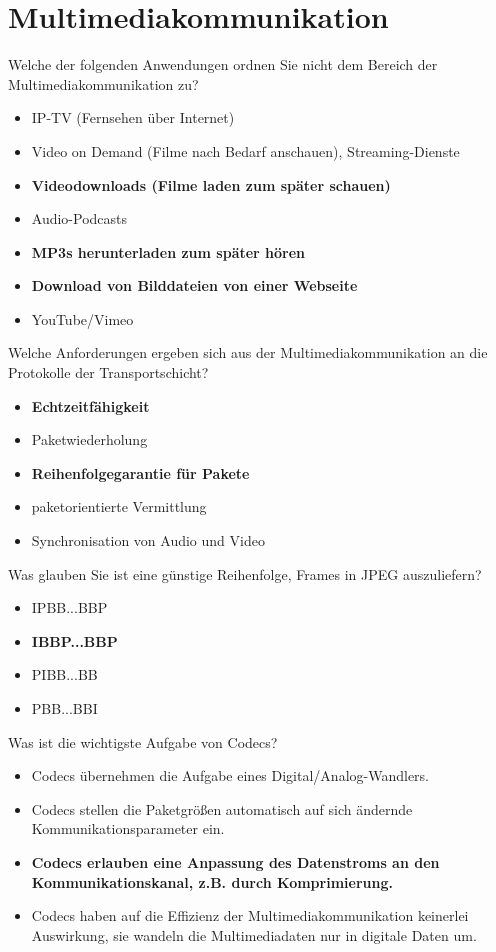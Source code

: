 \documentclass{article}
\begin{document}
	\section{Multimediakommunikation}
	
	Welche der folgenden Anwendungen ordnen Sie nicht dem Bereich der Multimediakommunikation zu? 
	\begin{itemize}
		\item IP-TV (Fernsehen über Internet)
		\item Video on Demand (Filme nach Bedarf anschauen), Streaming-Dienste
		\item \textbf{Videodownloads (Filme laden zum später schauen)}
		\item Audio-Podcasts
		\item \textbf{MP3s herunterladen zum später hören}
		\item \textbf{Download von Bilddateien von einer Webseite}
		\item YouTube/Vimeo
	\end{itemize}

	Welche Anforderungen ergeben sich aus der Multimediakommunikation an die Protokolle der Transportschicht? 
	\begin{itemize}
		\item \textbf{Echtzeitfähigkeit}
		\item Paketwiederholung
		\item \textbf{Reihenfolgegarantie für Pakete}
		\item paketorientierte Vermittlung
		\item Synchronisation von Audio und Video
	\end{itemize}

	Was glauben Sie ist eine günstige Reihenfolge, Frames in JPEG auszuliefern? 
	\begin{itemize}
		\item IPBB...BBP 
		\item \textbf{IBBP...BBP}
		\item PIBB...BB
		\item PBB...BBI
	\end{itemize}

	Was ist die wichtigste Aufgabe von Codecs?
	\begin{itemize}
		\item Codecs übernehmen die Aufgabe eines Digital/Analog-Wandlers.
		\item Codecs stellen die Paketgrößen automatisch auf sich ändernde Kommunikationsparameter ein.
		\item \textbf{Codecs erlauben eine Anpassung des Datenstroms an den Kommunikationskanal, z.B. durch Komprimierung.}
		\item Codecs haben auf die Effizienz der Multimediakommunikation keinerlei Auswirkung, sie wandeln die Multimediadaten nur in digitale Daten um.
	\end{itemize}
\end{document}

